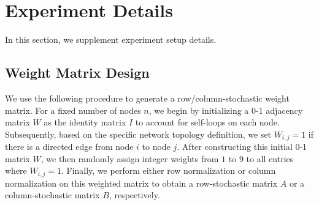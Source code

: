 \documentclass[10pt]{article}
\newcommand{\cO}{{\mathcal{O}}}
\newcommand{\EE}{\mathbb{E}}
\newcommand{\norm}[1]{\| #1 \|}
\begin{document}

\section{Experiment Details}\label{appendix:experiment}

In this section, we supplement experiment setup details.
\subsection{Weight Matrix Design}\label{app:subsec:weight matrix}
We use the following procedure to generate a row/column-stochastic weight matrix. For a fixed number of nodes $n$, we begin by initializing a 0-1 adjacency matrix $W$ as the identity matrix $I$ to account for self-loops on each node. Subsequently, based on the specific network topology definition, we set $W_{i,j}=1$ if there is a directed edge from node $i$ to node $j$. After constructing this initial 0-1 matrix $W$, we then randomly assign integer weights from $1$ to $9$ to all entries where $W_{i,j}=1$. Finally, we perform either row normalization or column normalization on this weighted matrix to obtain a row-stochastic matrix $A$ or a column-stochastic matrix $B$, respectively.
\end{document}
